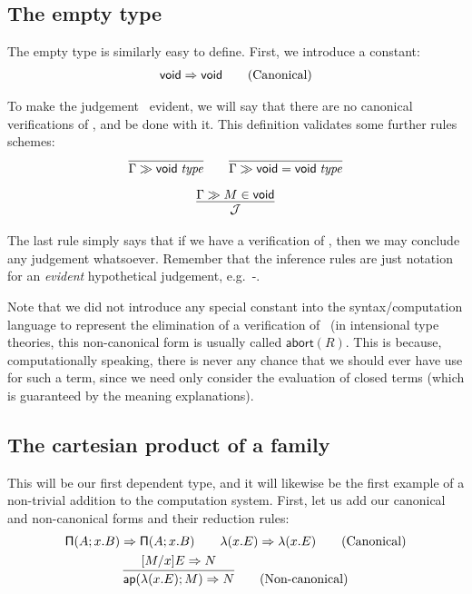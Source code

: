 \documentclass[main.tex]{subfiles}
\begin{document}
\subsection{The empty type}

The empty type is similarly easy to define. First, we introduce a constant:
\begin{gather*}
  \mathsf{void}\Rightarrow\mathsf{void}\tag{Canonical}
\end{gather*}

To make the judgement \isset\tyvoid\ evident, we will say that there are no
canonical verifications of \tyvoid, and be done with it. This definition
validates some further rules schemes:
\begin{gather*}
  \infer{
    \sequent\Gamma\isset\tyvoid
  }{
  }\qquad
  \infer{
    \sequent\Gamma\isset{\tyvoid=\tyvoid}
  }{
  }\\[6pt]
  \infer{
    \mathcal{J}
  }{
    \sequent\Gamma\ver{M}{\tyvoid}
  }
\end{gather*}

The last rule simply says that if we have a verification of \tyvoid, then we
may conclude any judgement whatsoever. Remember that the inference rules are
just notation for an \emph{evident} hypothetical judgement, e.g.\
\hyp{}{\sequent\Gamma{}}.

Note that we did not introduce any special constant into the syntax/computation
language to represent the elimination of a verification of \tyvoid\ (in
intensional type theories, this non-canonical form is usually called
$\mathsf{abort}(R)$. This is because, computationally speaking, there is never
any chance that we should ever have use for such a term, since we need only
consider the evaluation of closed terms (which is guaranteed by the meaning
explanations).

\subsection{The cartesian product of a family}

This will be our first dependent type, and it will likewise be the first
example of a non-trivial addition to the computation system. First, let us add
our canonical and non-canonical forms and their reduction rules:
\begin{gather*}
  \reduce{\typrod{A}{x}{B}}{\typrod{A}{x}{B}}
  \qquad
  \reduce{\lam{x}{E}}{\lam{x}{E}}
  \tag{Canonical}\\
  \infer{
    \reduce{\ap{\lam{x}{E}}{M}}{N}
  }{
    \reduce{[M/x]E}{N}
  }\tag{Non-canonical}
\end{gather*}
\end{document}
